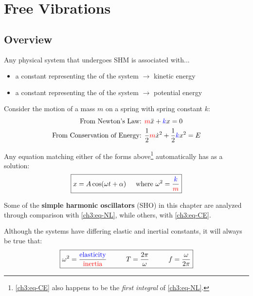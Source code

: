 \chapter{Free Vibrations} \label{ch:free-vibrations}

\section{Overview} \label{ch3:sec-simple-springs}
Any physical system that undergoes SHM is associated with...
\begin{itemize}
	\item a constant representing the  of the system $\longrightarrow$ kinetic energy
	\item a constant representing the  of the system $\longrightarrow$ potential energy
\end{itemize}

Consider the motion of a mass $m$ on a spring with spring constant $k$:
\begin{align}
	\text{From Newton's Law: }&
	\textcolor{red}{m}\ddot{x} + \textcolor{blue}{k}x = 0 \label{ch3:eq-NL} \\
	\text{From Conservation of Energy: }&
	\frac{1}{2}\textcolor{red}{m}\dot{x}^2 + \frac{1}{2}\textcolor{blue}{k}x^2 = E \label{ch3:eq-CE}
\end{align}

Any equation matching either of the forms above\footnote{\eqref{ch3:eq-CE} also happens to be the \textit{first integral} of  \eqref{ch3:eq-NL}.} automatically has as a solution:
\begin{equation}
\boxed{x = A \cos(\omega t+\alpha)\hspace{0.5cm}\text{where }\omega^2 = \frac{\textcolor{blue}{k}}{\textcolor{red}{m}}} \label{ch3:eq-SHM-soln}
\end{equation}

Some of the \textbf{simple harmonic oscillators} (SHO) in this chapter are analyzed through comparison with \eqref{ch3:eq-NL}, while others, with \eqref{ch3:eq-CE}.

Although the systems have differing elastic and inertial constants, it will always be true that:
\begin{equation}
	\boxed{
		\omega^2 = \frac{\kcol{\text{elasticity}}}{\mcol{\text{inertia}}} \hhtab 
		T = \frac{2\pi}{\omega} \hhtab 
		f = \frac{\omega}{2\pi}}
\end{equation}

